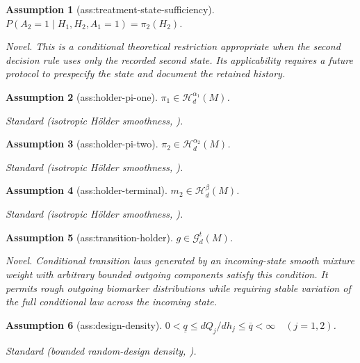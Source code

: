\documentclass{article}
\newtheorem{assumption}{Assumption}
\begin{document}
\begin{assumption}[ass:treatment-state-sufficiency]\label{ass:treatment-state-sufficiency}
\(P(A_2=1\mid H_1,H_2,A_1=1)=\pi_2(H_2)\).
\par\smallskip\noindent\emph{Novel.} This is a conditional theoretical restriction appropriate when the second decision rule uses only the recorded second state. Its applicability requires a future protocol to prespecify the state and document the retained history.
\end{assumption}

\begin{assumption}[ass:holder-pi-one]\label{ass:holder-pi-one}
\(\pi_1\in\mathcal H_d^{\alpha_1}(M)\).
\par\smallskip\noindent\emph{Standard} (isotropic Hölder smoothness, \cite{Tsybakov2009}).
\end{assumption}

\begin{assumption}[ass:holder-pi-two]\label{ass:holder-pi-two}
\(\pi_2\in\mathcal H_d^{\alpha_2}(M)\).
\par\smallskip\noindent\emph{Standard} (isotropic Hölder smoothness, \cite{Tsybakov2009}).
\end{assumption}

\begin{assumption}[ass:holder-terminal]\label{ass:holder-terminal}
\(m_2\in\mathcal H_d^{\beta}(M)\).
\par\smallskip\noindent\emph{Standard} (isotropic Hölder smoothness, \cite{Tsybakov2009}).
\end{assumption}

\begin{assumption}[ass:transition-holder]\label{ass:transition-holder}
\(g\in\mathcal G_d^t(M)\).
\par\smallskip\noindent\emph{Novel.} Conditional transition laws generated by an incoming-state smooth mixture weight with arbitrary bounded outgoing components satisfy this condition. It permits rough outgoing biomarker distributions while requiring stable variation of the full conditional law across the incoming state.
\end{assumption}

\begin{assumption}[ass:design-density]\label{ass:design-density}
\(0<\underline q\le dQ_j/dh_j\le\overline q<\infty\quad(j=1,2)\).
\par\smallskip\noindent\emph{Standard} (bounded random-design density, \cite{RobinsLiTchetgenVanderVaart2016}).
\end{assumption}
\end{document}
